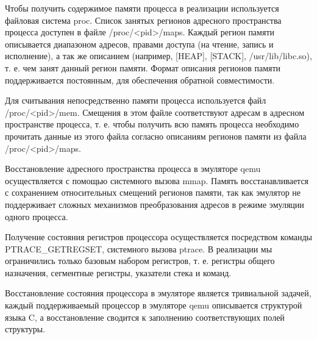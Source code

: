 Чтобы получить содержимое памяти процесса в реализации используется файловая система proc. Список занятых регионов адресного пространства процесса доступен в файле /proc/<pid>/maps. Каждый регион памяти описывается диапазоном адресов, правами доступа (на чтение, запись и исполнение), а так же описанием (например, [HEAP], [STACK], /usr/lib/libc.so), т. е. чем занят данный регион памяти. Формат описания регионов памяти поддерживается постоянным, для обеспечения обратной совместимости.

Для считывания непосредственно памяти процесса используется файл /proc/<pid>/mem. Смещения в этом файле соответствуют адресам в адресном пространстве процесса, т. е. чтобы получить всю память процесса необходимо прочитать данные из этого файла согласно описаниям регионов памяти из файла /proc/<pid>/maps.

Восстановление адресного пространства процесса в эмуляторе qemu осуществляется с помощью системного вызова mmap. Память восстанавливается с сохранением относительных смещений регионов памяти, так как эмулятор не поддерживает сложных механизмов преобразования адресов в режиме эмуляции одного процесса.

Получение состояния регистров процессора осуществляется посредством команды PTRACE\_GETREGSET, системного вызова ptrace. В реализации мы ограничились только базовым набором регистров, т. е. регистры общего назначения, сегментные регистры, указатели стека и команд.

Восстановление состояния процессора в эмуляторе является тривиальной задачей, каждый поддерживаемый процессор в эмуляторе qemu описывается структурой языка C, а восстановление сводится к заполнению соответствующих полей структуры.
